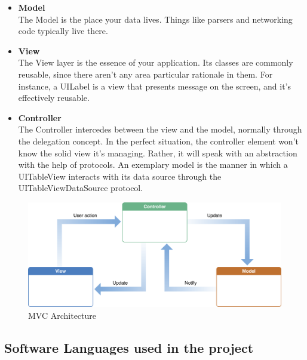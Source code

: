 \begin{itemize}
    \item \textbf{Model} \\
    The Model is the place your data lives. Things like parsers and networking code typically live there. \\
    
    \item \textbf{View} \\
    The View layer is the essence of your application. Its classes are commonly reusable, since there aren't any area particular rationale in them. For instance, a UILabel is a view that presents message on the screen, and it's effectively reusable. \\
  
    \item \textbf{Controller} \\
    The Controller intercedes between the view and the model, normally through the delegation concept. In the perfect situation, the controller element won't know the solid view it's managing. Rather, it will speak with an abstraction with the help of protocols. An exemplary model is the manner in which a UITableView interacts with its data source through the UITableViewDataSource protocol. \\
    
\end{itemize}

    \begin{figure}[H]
            \centering
            \includegraphics[width=1.0\linewidth]{figures/ch4/mvc.png}
            \caption{\label{fig:mvc} MVC Architecture \cite{MVC_Apple}}
        \end{figure}

\subsection{Software Languages used in the project}

